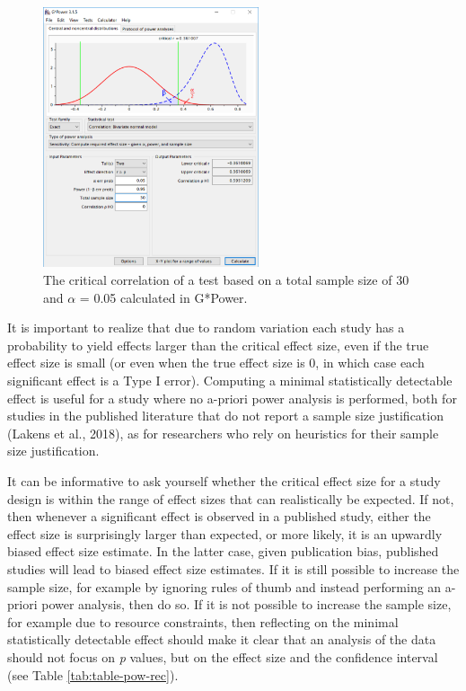 \documentclass[
  english,
  ,jou, a4paper,floatsintext]{apa6}
\begin{document}
\begin{figure}
\includegraphics[width=240px]{images/gpowcrit2} \caption{The critical correlation of a test based on a total sample size of 30 and $\alpha$ = 0.05 calculated in G*Power.}\label{fig:gcrit2}
\end{figure}

It is important to realize that due to random variation each study has a probability to yield effects larger than the critical effect size, even if the true effect size is small (or even when the true effect size is 0, in which case each significant effect is a Type I error). Computing a minimal statistically detectable effect is useful for a study where no a-priori power analysis is performed, both for studies in the published literature that do not report a sample size justification (Lakens et al., 2018), as for researchers who rely on heuristics for their sample size justification.

It can be informative to ask yourself whether the critical effect size for a study design is within the range of effect sizes that can realistically be expected. If not, then whenever a significant effect is observed in a published study, either the effect size is surprisingly larger than expected, or more likely, it is an upwardly biased effect size estimate. In the latter case, given publication bias, published studies will lead to biased effect size estimates. If it is still possible to increase the sample size, for example by ignoring rules of thumb and instead performing an a-priori power analysis, then do so. If it is not possible to increase the sample size, for example due to resource constraints, then reflecting on the minimal statistically detectable effect should make it clear that an analysis of the data should not focus on \emph{p} values, but on the effect size and the confidence interval (see Table \ref{tab:table-pow-rec}).
\end{document}
